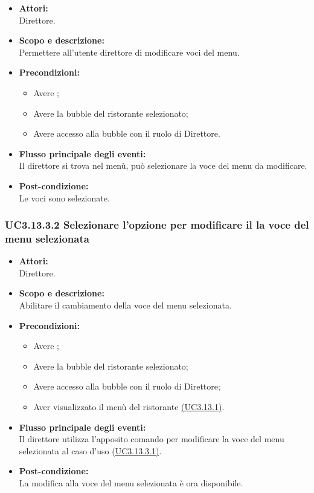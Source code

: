 \begin{itemize}
	\item \textbf{Attori:}
	\\Direttore.
	\item \textbf{Scopo e descrizione:} 
	\\Permettere all’utente direttore di modificare voci del menu.
	\item \textbf{Precondizioni:}
	\begin{itemize}
		\item Avere ;
		\item Avere la bubble del ristorante selezionato;
		\item Avere accesso alla bubble con il ruolo di Direttore.
	\end{itemize}
	\item \textbf{Flusso principale degli eventi:}
	\\Il direttore si trova nel menù, può selezionare la voce del menu da modificare.
	\item \textbf{Post-condizione:}
	\\Le voci sono selezionate.
\end{itemize}

\subsubsection{UC3.13.3.2 Selezionare l’opzione per modificare il la voce del menu selezionata} \label{UC3.13.3.2}

\begin{itemize}
	\item \textbf{Attori:}
	\\Direttore.
	\item \textbf{Scopo e descrizione:} 
	\\Abilitare il cambiamento della voce del menu selezionata.
	\item \textbf{Precondizioni:}
	\begin{itemize}
		\item Avere ;
		\item Avere la bubble del ristorante selezionato;
		\item Avere accesso alla bubble con il ruolo di Direttore;
		\item Aver visualizzato il menù del ristorante \hyperref[UC3.13.1]{(UC3.13.1)}.
	\end{itemize}
	\item \textbf{Flusso principale degli eventi:}
	\\Il direttore utilizza l'apposito comando per modificare la voce del menu selezionata al caso d’uso \hyperref[UC3.13.3.1]{(UC3.13.3.1)}.
	\item \textbf{Post-condizione:}
	\\La modifica alla voce del menu selezionata è ora disponibile.
\end{itemize}

